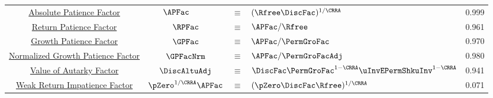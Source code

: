 \documentclass[\econtexRoot/BufferStockTheory]{subfiles}
\begin{document}
\begin{table}
{\begin{tabular}{|c|ccl|c|}
\href{https://\owner.github.io/BufferStockTheory\#APFacDefn}{Absolute Patience Factor}                    & $\APFac_{\phantom{\Rfree}} $ & $\equiv$ & $ (\Rfree \DiscFac)^{1/\CRRA}$                & 0.999 \\
\href{https://\owner.github.io/BufferStockTheory\#RPFacDefn}{Return Patience Factor}                      & $\RPFac$ & $\equiv$ & $\APFac/\Rfree $     & 0.961 \\
\href{https://\owner.github.io/BufferStockTheory\#GPFacRawDefn}{\phantom{Normalized~}Growth Patience Factor}    & $\GPFac$ & $\equiv$ & $\APFac/\PermGroFac $      & 0.970 \\
\href{https://\owner.github.io/BufferStockTheory\#GPFacRawDefn}{Normalized Growth Patience Factor}                      & $\GPFacNrm$ & $\equiv$ & $ \APFac/\PermGroFacAdj$& 0.980 \\
\href{https://\owner.github.io/BufferStockTheory\#VAFDefn}{Value of Autarky Factor}         & $\DiscAltuAdj $ & $\equiv$ & $ \DiscFac \PermGroFac^{1-\CRRA}\uInvEPermShkuInv^{1-\CRRA}$       & 0.941 \\ 
\href{https://\owner.github.io/BufferStockTheory\#WRICCond}{Weak Return Impatience Factor}         & $\pZero^{1/\CRRA} \APFac $ & $\equiv$ & $ (\pZero \DiscFac \Rfree)^{1/\CRRA}$       & 0.071 \\ \hline
\end{tabular}
} %
\settowidth\TableWidth{\usebox{\Calibration}}
\usebox{\Calibration}

\end{table}
%
\end{document}

